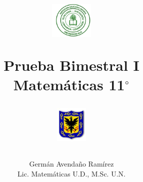 \documentclass[10pt,letterpaper,addpoints]{exam}
\begin{document}
\title{\begin{minipage}{.2\textwidth}
        \includegraphics[height=1.75cm]{Images/logo-colegio.png}
       \end{minipage}
\begin{minipage}{.55\textwidth}
 \begin{center}
 Prueba Bimestral I\\Matemáticas 11$^{\circ}$
\end{center}
\end{minipage}
\begin{minipage}{.2\textwidth}
\includegraphics[height=1.75cm]{Images/logo-sed.png} 
\end{minipage}
}
\author{Germ\'{a}n Avendaño Ram\'{i}rez\\Lic. Matemáticas U.D., M.Sc. U.N.}
\date{}
\maketitle
\begin{center}
\end{center}
\vspace{0.1in}
\end{document}
